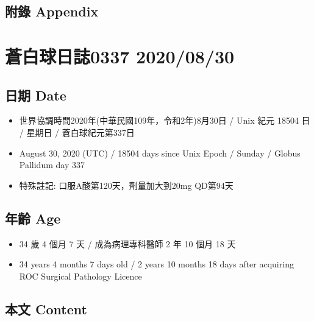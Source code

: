 \documentclass[
]{article}
\providecommand{\tightlist}{%
  \setlength{\itemsep}{0pt}\setlength{\parskip}{0pt}}
\begin{document}
\hypertarget{ux9644ux9304-appendix-28}{%
\subsection{附錄 Appendix}\label{ux9644ux9304-appendix-28}}

\hypertarget{ux84bcux767dux7403ux65e5ux8a8c0337-20200830}{%
\section{蒼白球日誌0337
2020/08/30}\label{ux84bcux767dux7403ux65e5ux8a8c0337-20200830}}

\hypertarget{ux65e5ux671f-date-29}{%
\subsection{日期 Date}\label{ux65e5ux671f-date-29}}

\begin{itemize}
\tightlist
\item
  世界協調時間2020年(中華民國109年，令和2年)8月30日 / Unix 紀元 18504 日
  / 星期日 / 蒼白球紀元第337日
\item
  August 30, 2020 (UTC) / 18504 days since Unix Epoch / Sunday / Globus
  Pallidum day 337
\item
  特殊註記: 口服A酸第120天，劑量加大到20mg QD第94天
\end{itemize}

\hypertarget{ux5e74ux9f61-age-29}{%
\subsection{年齡 Age}\label{ux5e74ux9f61-age-29}}

\begin{itemize}
\tightlist
\item
  34 歲 4 個月 7 天 / 成為病理專科醫師 2 年 10 個月 18 天
\item
  34 years 4 months 7 days old / 2 years 10 months 18 days after
  acquiring ROC Surgical Pathology Licence
\end{itemize}

\hypertarget{ux672cux6587-content-29}{%
\subsection{本文 Content}\label{ux672cux6587-content-29}}
\end{document}

